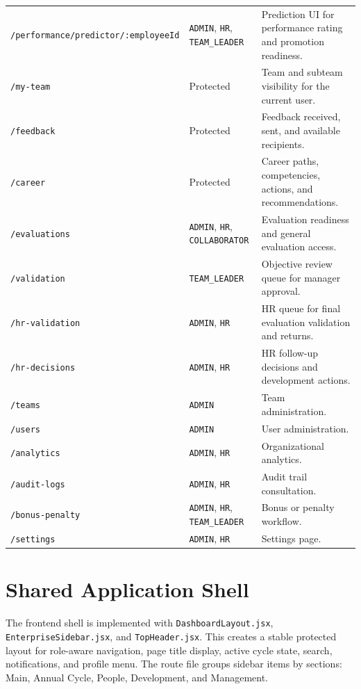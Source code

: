 \begin{longtable}{p{}p{}p{}}
\texttt{/performance/predictor/:employeeId} & \texttt{ADMIN}, \texttt{HR}, \texttt{TEAM\_LEADER} & Prediction UI for performance rating and promotion readiness.\\
\texttt{/my-team} & Protected & Team and subteam visibility for the current user.\\
\texttt{/feedback} & Protected & Feedback received, sent, and available recipients.\\
\texttt{/career} & Protected & Career paths, competencies, actions, and recommendations.\\
\texttt{/evaluations} & \texttt{ADMIN}, \texttt{HR}, \texttt{COLLABORATOR} & Evaluation readiness and general evaluation access.\\
\texttt{/validation} & \texttt{TEAM\_LEADER} & Objective review queue for manager approval.\\
\texttt{/hr-validation} & \texttt{ADMIN}, \texttt{HR} & HR queue for final evaluation validation and returns.\\
\texttt{/hr-decisions} & \texttt{ADMIN}, \texttt{HR} & HR follow-up decisions and development actions.\\
\texttt{/teams} & \texttt{ADMIN} & Team administration.\\
\texttt{/users} & \texttt{ADMIN} & User administration.\\
\texttt{/analytics} & \texttt{ADMIN}, \texttt{HR} & Organizational analytics.\\
\texttt{/audit-logs} & \texttt{ADMIN}, \texttt{HR} & Audit trail consultation.\\
\texttt{/bonus-penalty} & \texttt{ADMIN}, \texttt{HR}, \texttt{TEAM\_LEADER} & Bonus or penalty workflow.\\
\texttt{/settings} & \texttt{ADMIN}, \texttt{HR} & Settings page.\\
\bottomrule
\end{longtable}

\section{Shared Application Shell}
The frontend shell is implemented with \texttt{DashboardLayout.jsx}, \texttt{EnterpriseSidebar.jsx}, and \texttt{TopHeader.jsx}. This creates a stable protected layout for role-aware navigation, page title display, active cycle state, search, notifications, and profile menu. The route file groups sidebar items by sections: Main, Annual Cycle, People, Development, and Management.

